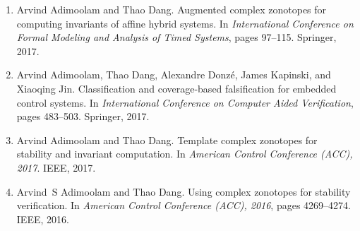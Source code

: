 

\begin{enumerate}
\item Arvind Adimoolam and Thao Dang.
\newblock Augmented complex zonotopes for computing invariants of affine hybrid
  systems.
\newblock In {\em International Conference on Formal Modeling and Analysis of
  Timed Systems}, pages 97--115. Springer, 2017.

\item %
Arvind Adimoolam, Thao Dang, Alexandre Donz{\'e}, James Kapinski, and Xiaoqing
  Jin.
\newblock Classification and coverage-based falsification for embedded control
  systems.
\newblock In {\em International Conference on Computer Aided Verification},
  pages 483--503. Springer, 2017.


\item %
Arvind Adimoolam and Thao Dang.
\newblock Template complex zonotopes for stability and invariant computation.
\newblock In {\em American Control Conference (ACC), 2017}. IEEE, 2017.


\item %
Arvind~S Adimoolam and Thao Dang.
\newblock Using complex zonotopes for stability verification.
\newblock In {\em American Control Conference (ACC), 2016}, pages 4269--4274.
  IEEE, 2016.
\end{enumerate}

